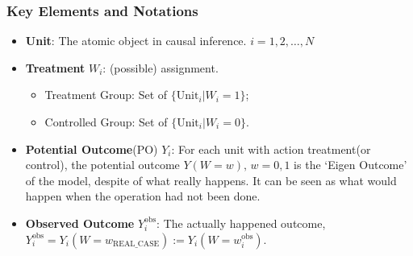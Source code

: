      

    

    
\subsubsection{Key Elements and Notations}

\begin{itemize}[topsep=2pt,itemsep=0pt]
    \item \textbf{Unit}: The atomic object in causal inference. $ i=1,2,\ldots,N $
    \item \textbf{Treatment} $ W_i $: (possible) assignment.
    \begin{itemize}[topsep=2pt,itemsep=0pt]
        \item Treatment Group: Set of $ \{\mathrm{Unit}_i|W_i=1\} $;
        \item Controlled Group: Set of $ \{\mathrm{Unit}_i|W_i=0 \} $.
    \end{itemize}
    \item \textbf{Potential Outcome}(PO) $ Y_i $: For each unit with action  treatment(or control), the potential outcome $ Y(W=w),\,w=0,1 $ is the `Eigen Outcome' of the model, despite of what really happens. It can be seen as what would happen when the operation had not been done.
    \item \textbf{Observed Outcome} $ Y_i^\mathrm{obs}  $: The actually happened outcome, $ Y_i^\mathrm{obs}=Y_i(W=w_\mathrm{REAL\_CASE}):=Y_i(W=w_i^\mathrm{obs} ) $.
    

\end{itemize}
